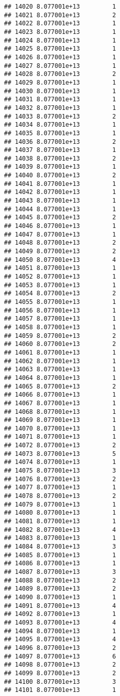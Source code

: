 \documentclass[
]{article}
\begin{document}
\begin{verbatim}
## 14020 8.077001e+13         1
## 14021 8.077001e+13         2
## 14022 8.077001e+13         1
## 14023 8.077001e+13         1
## 14024 8.077001e+13         1
## 14025 8.077001e+13         1
## 14026 8.077001e+13         1
## 14027 8.077001e+13         1
## 14028 8.077001e+13         2
## 14029 8.077001e+13         1
## 14030 8.077001e+13         1
## 14031 8.077001e+13         1
## 14032 8.077001e+13         1
## 14033 8.077001e+13         2
## 14034 8.077001e+13         1
## 14035 8.077001e+13         1
## 14036 8.077001e+13         2
## 14037 8.077001e+13         1
## 14038 8.077001e+13         2
## 14039 8.077001e+13         1
## 14040 8.077001e+13         2
## 14041 8.077001e+13         1
## 14042 8.077001e+13         1
## 14043 8.077001e+13         1
## 14044 8.077001e+13         1
## 14045 8.077001e+13         2
## 14046 8.077001e+13         1
## 14047 8.077001e+13         1
## 14048 8.077001e+13         2
## 14049 8.077001e+13         2
## 14050 8.077001e+13         4
## 14051 8.077001e+13         1
## 14052 8.077001e+13         1
## 14053 8.077001e+13         1
## 14054 8.077001e+13         2
## 14055 8.077001e+13         1
## 14056 8.077001e+13         1
## 14057 8.077001e+13         1
## 14058 8.077001e+13         1
## 14059 8.077001e+13         2
## 14060 8.077001e+13         2
## 14061 8.077001e+13         1
## 14062 8.077001e+13         1
## 14063 8.077001e+13         1
## 14064 8.077001e+13         1
## 14065 8.077001e+13         2
## 14066 8.077001e+13         1
## 14067 8.077001e+13         1
## 14068 8.077001e+13         1
## 14069 8.077001e+13         1
## 14070 8.077001e+13         1
## 14071 8.077001e+13         1
## 14072 8.077001e+13         2
## 14073 8.077001e+13         5
## 14074 8.077001e+13         1
## 14075 8.077001e+13         3
## 14076 8.077001e+13         2
## 14077 8.077001e+13         1
## 14078 8.077001e+13         2
## 14079 8.077001e+13         1
## 14080 8.077001e+13         1
## 14081 8.077001e+13         1
## 14082 8.077001e+13         4
## 14083 8.077001e+13         1
## 14084 8.077001e+13         3
## 14085 8.077001e+13         1
## 14086 8.077001e+13         1
## 14087 8.077001e+13         3
## 14088 8.077001e+13         2
## 14089 8.077001e+13         2
## 14090 8.077001e+13         1
## 14091 8.077001e+13         4
## 14092 8.077001e+13         1
## 14093 8.077001e+13         4
## 14094 8.077001e+13         1
## 14095 8.077001e+13         4
## 14096 8.077001e+13         2
## 14097 8.077001e+13         6
## 14098 8.077001e+13         2
## 14099 8.077001e+13         2
## 14100 8.077001e+13         3
## 14101 8.077001e+13         1

\end{verbatim}
\end{document}
